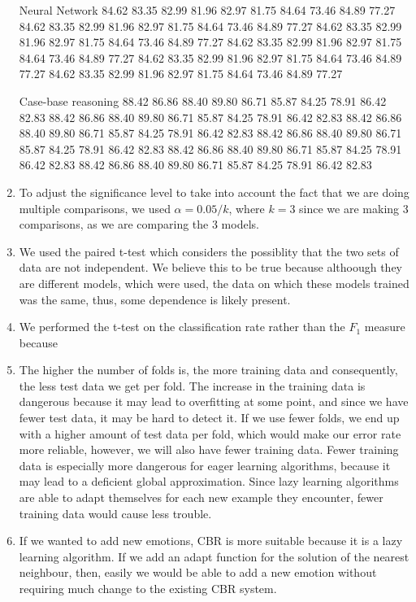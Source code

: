 \documentclass[a4paper,12pt,oneside,final]{report}
\begin{document}
\begin{enumerate}
Neural Network
84.62 83.35 82.99 81.96 82.97 81.75 84.64 73.46 84.89 77.27 
84.62 83.35 82.99 81.96 82.97 81.75 84.64 73.46 84.89 77.27 
84.62 83.35 82.99 81.96 82.97 81.75 84.64 73.46 84.89 77.27 
84.62 83.35 82.99 81.96 82.97 81.75 84.64 73.46 84.89 77.27 
84.62 83.35 82.99 81.96 82.97 81.75 84.64 73.46 84.89 77.27 
84.62 83.35 82.99 81.96 82.97 81.75 84.64 73.46 84.89 77.27 

Case-base reasoning
88.42  86.86  88.40  89.80  86.71  85.87  84.25  78.91  86.42  82.83 
88.42  86.86  88.40  89.80  86.71  85.87  84.25  78.91  86.42  82.83 
88.42  86.86  88.40  89.80  86.71  85.87  84.25  78.91  86.42  82.83 
88.42  86.86  88.40  89.80  86.71  85.87  84.25  78.91  86.42  82.83 
88.42  86.86  88.40  89.80  86.71  85.87  84.25  78.91  86.42  82.83 
88.42  86.86  88.40  89.80  86.71  85.87  84.25  78.91  86.42  82.83 


\item To adjust the significance level to take into account the fact that we are doing multiple comparisons, we used $\alpha = 0.05 / k$, where $k = 3$ since we are making 3 comparisons, as we are comparing the 3 models.

\item We used the paired t-test which considers the possiblity that the two sets of data are not independent.  We believe this to be true because althoough they are different models, which were used, the data on which these models trained was the same, thus, some dependence is likely present.

\item We performed the t-test on the classification rate rather than the $F_1$ measure because 

\item The higher the number of folds is, the more training data and consequently, the less test data we get per fold. 
    The increase in the training data is dangerous because it may lead to overfitting at some point,
    and since we have fewer test data, it may be hard to detect it. If we use fewer folds, we end up 
    with a higher amount of test data per fold, which would make our error rate more reliable, however, we 
    will also have fewer training data. Fewer training data is especially more dangerous for eager learning
    algorithms, because it may lead to a deficient global approximation. Since lazy learning algorithms are able to adapt
    themselves for each new example they encounter, fewer training data would cause less trouble.

\item If we wanted to add new emotions, CBR is more suitable because it is a lazy learning algorithm. 
    If we add an adapt function for the solution of the nearest neighbour, then, easily we would be able to add
    a new emotion without requiring much change to the existing CBR system.
    

\end{enumerate}
\end{document}

